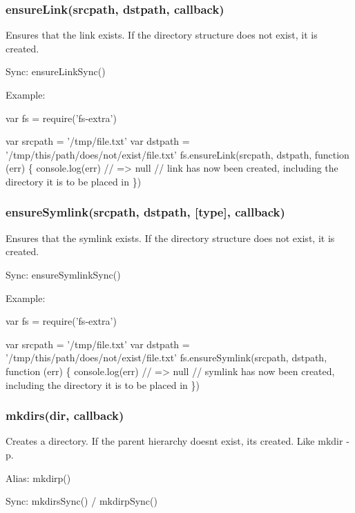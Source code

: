 \subsubsection*{ensure\+Link(srcpath, dstpath, callback)}

Ensures that the link exists. If the directory structure does not exist, it is created.

Sync\+: {\ttfamily ensure\+Link\+Sync()}

Example\+:


\begin{DoxyCode}
var fs = require('fs-extra')

var srcpath = '/tmp/file.txt'
var dstpath = '/tmp/this/path/does/not/exist/file.txt'
fs.ensureLink(srcpath, dstpath, function (err) \{
  console.log(err) // => null
  // link has now been created, including the directory it is to be placed in
\})
\end{DoxyCode}


\subsubsection*{ensure\+Symlink(srcpath, dstpath, \mbox{[}type\mbox{]}, callback)}

Ensures that the symlink exists. If the directory structure does not exist, it is created.

Sync\+: {\ttfamily ensure\+Symlink\+Sync()}

Example\+:


\begin{DoxyCode}
var fs = require('fs-extra')

var srcpath = '/tmp/file.txt'
var dstpath = '/tmp/this/path/does/not/exist/file.txt'
fs.ensureSymlink(srcpath, dstpath, function (err) \{
  console.log(err) // => null
  // symlink has now been created, including the directory it is to be placed in
\})
\end{DoxyCode}


\subsubsection*{mkdirs(dir, callback)}

Creates a directory. If the parent hierarchy doesn\textquotesingle{}t exist, it\textquotesingle{}s created. Like {\ttfamily mkdir -\/p}.

Alias\+: {\ttfamily mkdirp()}

Sync\+: {\ttfamily mkdirs\+Sync()} / {\ttfamily mkdirp\+Sync()}

